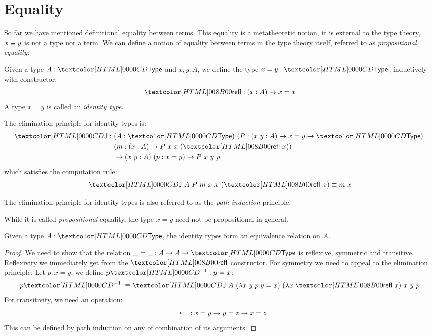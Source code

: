 \section{Equality}

So far we have mentioned definitional equality between terms. This
equality is a metatheoretic notion, it is external to the type theory,
\ie $x \equiv y$ is not a type nor a term. We can define a notion of
equality between terms in the type theory itself, referred to as
\emph{propositional equality}:

\begin{definition}
  Given a type $A : \Type$ and $x, y : A$, we define the type
  $x = y : \Type$, inductively with constructor:
  $$
  \refl : (x : A) \to x = x
  $$
  A type $x = y$ is called an \emph{identity type}.
  
  The elimination principle for identity types is:
  \begin{align*}
  \J : &\ (A : \Type)\ (P : (x\ y : A) \to x = y \to \Type)\ \\
  &\ (m : (x : A) \to P\ x\ x\ (\refl\ x)) \\
  &\ \to (x\ y : A)\ (p : x = y) \to P\ x\ y\ p
  \end{align*}
  which satisfies the computation rule:
  $$
  \J\ A\ P\ m\ x\ x\ (\refl\ x) \defeq m\ x
  $$
\end{definition}

\begin{remark}
  The elimination principle for identity types is also referred to as
  the \emph{path induction} principle.
\end{remark}

\begin{remark}
  While it is called \emph{propositional} equality, the type $x = y$
  need not be propositional in general.
\end{remark}

\begin{lemma}
  Given a type $A : \Type$, the identity types form an equivalence
  relation on $A$.
\end{lemma}

\begin{proof}
  We need to show that the relation $\_ = \_ : A \to A \to \Type$ is
  reflexive, symmetric and transitive. Reflexivity we immediately get
  from the $\refl$ constructor. For symmetry we need to appeal to the
  elimination principle. Let $p : x = y$, we define $\sym{p} : y = x$:
  $$
  \sym{p} \ddefeq \J\ A\ (\lambda x\ y\ p . y = x)\ (\lambda x . \refl\ x)\ x\ y\ p
  $$
  For transitivity, we need an operation:
  $$
  \trans{\_}{\_} : x = y \to y = z \to x = z
  $$
  This can be defined by path induction on any of combination of its
  arguments.
\end{proof}

